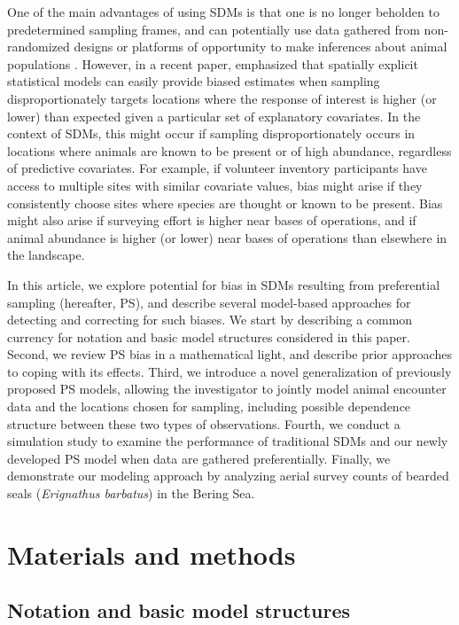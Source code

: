 \documentclass[times,mee,doublespace,]{besauth2}
\begin{document}
One of the main advantages of using SDMs is that one is no longer beholden to predetermined sampling frames, and can potentially use data gathered from non-randomized designs or platforms of opportunity to make inferences about animal populations \citep{JohnsonEtAl2010}.  However,
in a recent paper, \citet{DiggleEtAl2010} emphasized that spatially explicit statistical models can easily provide biased estimates when sampling disproportionately targets locations where the response of interest is higher (or lower) than expected given a particular set of explanatory covariates.  In the context of SDMs, this might occur if sampling disproportionately occurs in locations where animals are known to be present or of high abundance, regardless of predictive covariates. For example, if volunteer inventory participants have access to multiple sites with similar covariate values, bias might arise if they consistently choose sites where species are thought or known to be present.  Bias might also arise if surveying effort is higher near bases of operations, and if animal abundance is higher (or lower) near bases of operations than elsewhere in the landscape.


In this article, we explore potential for bias in SDMs resulting from preferential sampling (hereafter, PS), and describe several model-based approaches for detecting and correcting for such biases.  We start by describing a common currency for notation and basic model structures considered in this paper.  Second, we review PS bias in a mathematical light, and describe prior approaches to coping with its effects. Third, we introduce a novel generalization of previously proposed PS models, allowing the investigator to jointly model animal encounter data and the locations chosen for sampling, including possible dependence structure between these two types of observations.  Fourth, we conduct a simulation study to examine the performance of traditional SDMs and our newly developed PS model when data are gathered preferentially.  Finally, we demonstrate our modeling approach by analyzing aerial survey counts of bearded seals (\textit{Erignathus barbatus}) in the Bering Sea.


\section{Materials and methods}


\subsection{Notation and basic model structures}
\end{document}
